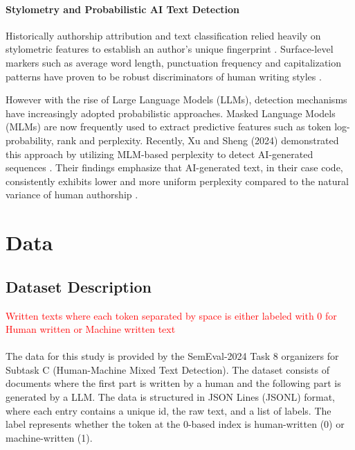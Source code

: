 \documentclass[11pt]{article}
\begin{document}
\paragraph{Stylometry and Probabilistic AI Text Detection}
Historically authorship attribution and text classification relied heavily on stylometric features to establish an author's unique fingerprint \cite{neal2017surveying}.
Surface-level markers such as average word length, punctuation frequency and capitalization patterns have proven to be robust discriminators of human writing styles \cite{neal2017surveying}.

However with the rise of Large Language Models (LLMs), detection mechanisms have increasingly adopted probabilistic approaches.
Masked Language Models (MLMs) are now frequently used to extract predictive features such as token log-probability, rank and perplexity.
Recently, Xu and Sheng (2024) demonstrated this approach by utilizing MLM-based perplexity to detect AI-generated sequences \cite{xu2024detecting}.
Their findings emphasize that AI-generated text, in their case code, consistently exhibits lower and more uniform perplexity compared to the natural variance of human authorship \cite{xu2024detecting}.

\section{Data}

\subsection{Dataset Description}

\textcolor{red}{Written texts where each token separated by space is either labeled with 0 for Human written or Machine written text}
\\ \\

The data for this study is provided by the SemEval-2024 Task 8 organizers for Subtask C (Human-Machine Mixed Text Detection).
The dataset consists of documents where the first part is written by a human and the following part is generated by a LLM.
The data is structured in JSON Lines (JSONL) format, where each entry contains a unique id, the raw text, and a list of labels.
The label represents whether the token at the 0-based index is human-written (0) or machine-written (1).
\end{document}
